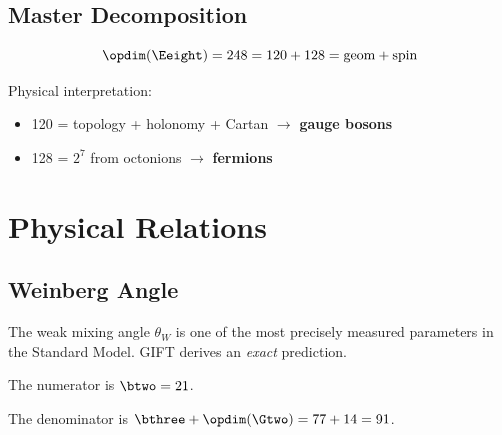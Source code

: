 \section{Master Decomposition}

\begin{theorem}[E8 = SO(16) + Spinor]\label{thm:E8_SO16_decomposition}
    \leanok
    \[
        \opdim(\Eeight) = 248 = 120 + 128 = \mathrm{geom} + \mathrm{spin}
    \]
\end{theorem}

\begin{theorem}\label{thm:gauge_fermion_split}
    \leanok
    Physical interpretation:
    \begin{itemize}
        \item 120 = topology + holonomy + Cartan $\to$ \textbf{gauge bosons}
        \item 128 = $2^7$ from octonions $\to$ \textbf{fermions}
    \end{itemize}
\end{theorem}

\chapter{Physical Relations}\label{chap:relations}

\section{Weinberg Angle}

The weak mixing angle $\theta_W$ is one of the most precisely measured parameters
in the Standard Model. GIFT derives an \emph{exact} prediction.

\begin{definition}\label{def:weinberg_num}
    \leanok
    The numerator is $\btwo = 21$.
\end{definition}

\begin{definition}\label{def:weinberg_den}
    \leanok
    The denominator is $\bthree + \opdim(\Gtwo) = 77 + 14 = 91$.
\end{definition}

